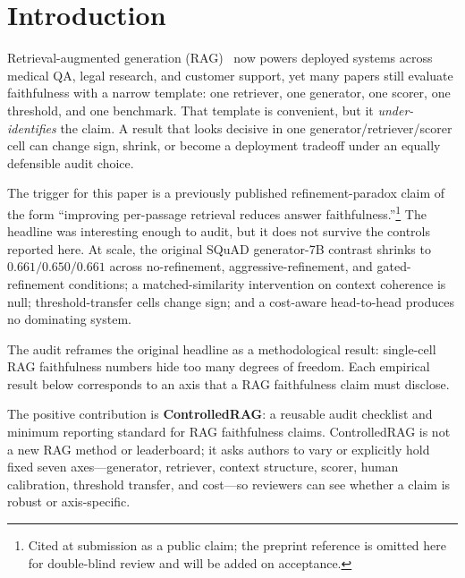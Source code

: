 \section{Introduction}
\label{sec:intro}

Retrieval-augmented generation (RAG)~\citep{lewis2020rag} now powers
deployed systems across medical QA, legal research, and customer
support, yet many papers still evaluate faithfulness with a narrow
template: one retriever, one generator, one scorer, one threshold, and
one benchmark. That template is convenient, but it
\emph{under-identifies} the claim. A result that looks decisive in one
generator/retriever/scorer cell can change sign, shrink, or become a
deployment tradeoff under an equally defensible audit choice.

The trigger for this paper is a previously published refinement-paradox
claim of the form ``improving per-passage retrieval reduces answer
faithfulness.''\footnote{Cited at submission as a public claim; the
preprint reference is omitted here for double-blind review and will
be added on acceptance.} The headline was interesting enough to
audit, but it does not survive the controls reported here. At scale,
the original SQuAD generator-7B contrast shrinks to
$0.661 / 0.650 / 0.661$ across no-refinement, aggressive-refinement,
and gated-refinement conditions; a matched-similarity intervention on
context coherence is null; threshold-transfer cells change sign; and
a cost-aware head-to-head produces no dominating system.

The audit reframes the original headline as a methodological result:
single-cell RAG faithfulness numbers hide too many degrees of freedom.
Each empirical result below corresponds to an axis that a RAG
faithfulness claim must disclose.

The positive contribution is \textbf{ControlledRAG}: a reusable audit
checklist and minimum reporting standard for RAG faithfulness claims.
ControlledRAG is not a new RAG method or leaderboard; it asks authors
to vary or explicitly hold fixed seven axes---generator, retriever,
context structure, scorer, human calibration, threshold transfer, and
cost---so reviewers can see whether a claim is robust or axis-specific.

